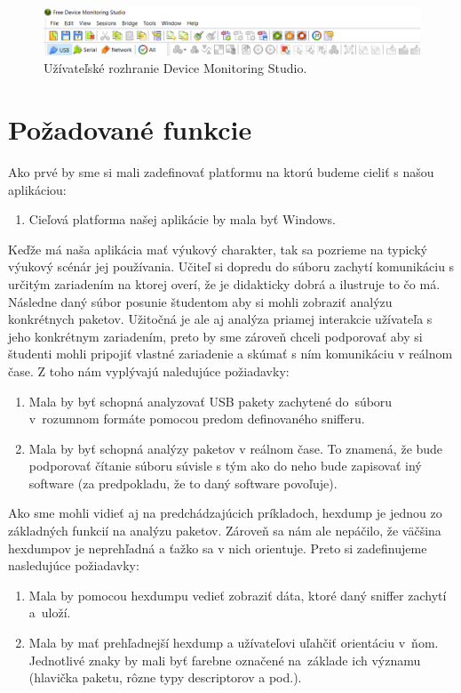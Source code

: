 \begin{figure}[!htb]
	\centering
	\includegraphics[width=\textwidth]{img/uvod_hhd_interface}
	\caption{Užívateľské rozhranie Device Monitoring Studio.}
	\label{obr:uvod:hhd_interface}
\end{figure}


\section{Požadované funkcie}
\label{uvod:sec:pozadovane_funkcie}

Ako prvé by sme si mali zadefinovať platformu na ktorú budeme cieliť s našou aplikáciou:
\begin{enumerate}[label=\textbf{P\arabic*}]
	\item \label{uvod:poz:platforma} Cieľová platforma našej aplikácie by mala byť Windows. 
\end{enumerate}

Keďže má naša aplikácia mať výukový charakter, tak sa pozrieme na typický výukový scénár jej používania. Učiteľ si dopredu do súboru zachytí komunikáciu s určitým zariadením na ktorej overí, že je didakticky dobrá a ilustruje to čo má. Následne daný súbor posunie študentom aby si mohli zobraziť analýzu konkrétnych paketov. Užitočná je ale aj analýza priamej interakcie užívateľa s jeho konkrétnym zariadením, preto by sme zároveň chceli podporovať aby si študenti mohli pripojiť vlastné zariadenie a skúmať s ním komunikáciu v reálnom čase. Z toho nám vyplývajú naledujúce požiadavky:
\begin{enumerate}[label=\textbf{P\arabic*},resume]
	\item \label{uvod:poz:analyza} Mala by byť schopná analyzovať USB pakety zachytené do~súboru v~rozumnom formáte pomocou predom definovaného snifferu.
	\item \label{uvod:poz:analyza_real_time} Mala by byť schopná analýzy paketov v reálnom čase. To znamená, že bude podporovať čítanie súboru súvisle s tým ako do neho bude zapisovať iný software (za predpokladu, že to daný software povoľuje).
\end{enumerate}

Ako sme mohli vidieť aj na predchádzajúcich príkladoch, hexdump je jednou zo základných funkcií na analýzu paketov. Zároveň sa nám ale nepáčilo, že väčšina hexdumpov je neprehľadná a ťažko sa v nich orientuje. Preto si zadefinujeme nasledujúce požiadavky:
\begin{enumerate}[label=\textbf{P\arabic*},resume]
	\item \label{uvod:poz:hexdump} Mala by pomocou hexdumpu vedieť zobraziť dáta, ktoré daný sniffer zachytí a~uloží.
	\item \label{uvod:poz:data_highlight} Mala by mať prehľadnejší hexdump a užívateľovi uľahčiť orientáciu v~ňom. Jednotlivé znaky by mali byť farebne označené na~základe ich významu (hlavička paketu, rôzne typy descriptorov a pod.).
\end{enumerate}

